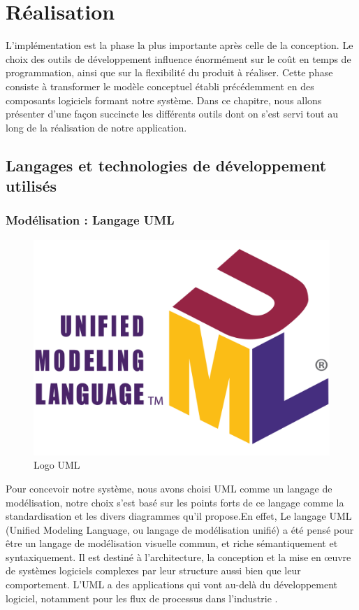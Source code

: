 \chapter{Réalisation}
\label{chap:Réalisation}


L’implémentation est la phase la plus importante après celle de la conception. Le choix
des outils de développement influence énormément sur le coût en temps de programmation, ainsi que sur la flexibilité du produit à réaliser. Cette phase consiste à transformer
le modèle conceptuel établi précédemment en des composants logiciels formant notre système. Dans ce chapitre, nous allons présenter d’une façon succincte les différents outils
dont on s’est servi tout au long de la réalisation de notre application.
\pagebreak
\section{Langages et technologies de développement utilisés}


\subsection{Modélisation : Langage UML}

\begin{figure}[H]
    \centering
    \includegraphics[scale=0.15]{Logos/UML_logo.png}
    \caption{Logo UML}
\end{figure}

Pour concevoir notre système, nous avons choisi UML comme un
langage de modélisation, notre choix s’est basé sur les points forts de
ce langage comme la standardisation et les divers diagrammes qu’il
propose.En effet, Le langage UML (Unified Modeling Language, ou langage de modélisation unifié) a été pensé pour être un langage de modélisation visuelle commun, et riche sémantiquement et syntaxiquement. Il est destiné à l'architecture, la conception et la mise en œuvre de systèmes logiciels complexes par leur structure aussi bien que leur comportement. L'UML a des applications qui vont au-delà du développement logiciel, notamment pour les flux de processus dans l'industrie \cite{UML}.

